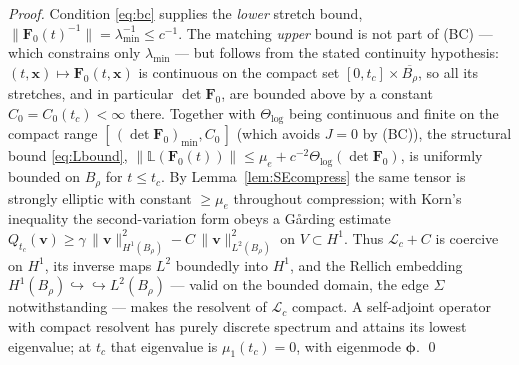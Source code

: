 \begin{proof}
    Condition \eqref{eq:bc} supplies the \emph{lower} stretch bound, $\|\bm{F}_0(t)^{-1}\|=\lambda_{\min}^{-1}\le
        c^{-1}$. The matching \emph{upper} bound is not part of (BC) --- which constrains only $\lambda_{\min}$ --- but follows
    from the stated continuity hypothesis: $(t,\bm x)\mapsto\bm F_0(t,\bm x)$ is continuous on the compact set
    $[0,t_c]\times\overline{B_\rho}$, so all
    its stretches, and in particular $\det\bm F_0$, are bounded above by a constant $C_0=C_0(t_c)<\infty$ there.
    Together with $\Theta_{\log}$ being continuous and finite on the compact range $[\,(\det\bm F_0)_{\min},C_0\,]$
    (which avoids $J=0$ by (BC)), the structural bound \eqref{eq:Lbound},
    $\|\mathbb{L}(\bm{F}_0(t))\|\le\mu_e+c^{-2}\Theta_{\log}(\det\bm{F}_0)$, is uniformly bounded on $B_\rho$ for
    $t\le t_c$. By Lemma~\ref{lem:SEcompress} the same tensor is strongly elliptic with constant $\ge\mu_e$ throughout
    compression; with Korn's inequality the second-variation form obeys a G\aa rding estimate
    $Q_{t_c}(\bm{v})\ge\gamma\,\|\bm{v}\|_{H^1(B_\rho)}^2-C\,\|\bm{v}\|_{L^2(B_\rho)}^2$ on $V\subset H^1$. Thus
    $\mathcal{L}_c+C$ is coercive on $H^1$, its inverse maps $L^2$ boundedly into $H^1$, and the Rellich embedding
    $H^1(B_\rho)\hookrightarrow\hookrightarrow L^2(B_\rho)$ --- valid on the bounded domain, the edge $\Sigma$
    notwithstanding --- makes the resolvent of $\mathcal{L}_c$ compact. A self-adjoint operator with compact resolvent
    has purely discrete spectrum and attains its lowest eigenvalue; at $t_c$ that eigenvalue is $\mu_1(t_c)=0$, with
    eigenmode $\bm{\phi}$. \qed
\end{proof}

